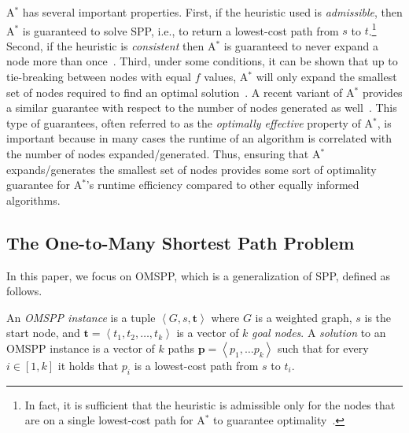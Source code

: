 \documentclass[smallextended]{svjour3}       %
\newcommand{\omspp}{\ac{OMSPP}\xspace}
\newcommand{\spp}{\ac{SPP}\xspace}
\newcommand{\astar}{A$^*$\xspace}
\newcommand{\tuple}[1]{\ensuremath{\left \langle #1 \right \rangle }}
\newcommand{\vect}[1]{\mathbf{#1}}
\newcommand{\roni}[1]{\textbf{[RS:#1]}}
\begin{document}
\astar has several important properties. 
First, if the heuristic used is \emph{admissible}, then \astar is guaranteed to solve SPP, i.e., to return a lowest-cost path from $s$ to $t$.\footnote{In fact, it is sufficient that the heuristic is admissible only for the nodes that are on a single lowest-cost path for \astar to guarantee optimality~\cite{karpas2012optimal,dechter1985generalizedBestFirst}.}
Second, if the heuristic is \emph{consistent} then \astar is guaranteed to never expand a node more than once~\cite{hartNR68Astar}.
Third, under some conditions, it can be shown that up to tie-breaking between nodes with equal $f$ values, \astar will only expand the smallest set of nodes required to find an optimal solution~\cite{dechter1985generalizedBestFirst}. 
A recent variant of \astar provides a similar guarantee with respect to the number of nodes generated as well~\cite{goldenberg2013optimal}. 
This type of guarantees, often referred to as the \emph{optimally effective} property of \astar, is important because in many cases the runtime of an algorithm is correlated with the number of nodes expanded/generated. 
Thus, ensuring that \astar expands/generates the smallest set of nodes provides some sort of optimality guarantee for \astar's runtime efficiency compared to other equally informed algorithms.



\subsection{The One-to-Many Shortest Path Problem}

In this paper, we focus on \omspp, which is a generalization of \spp, defined as follows. 
\begin{definition}
  \label{def:k-goal}
  An \emph{\omspp instance} is a tuple $\tuple{G, s, \vect{t}}$ where $G$ is a weighted graph, $s$ is the start node, and $\vect{t}=\tuple{t_1, t_2,\ldots, t_k}$ is a vector of $k$ \emph{goal nodes}. %
  A \emph{solution} to an \omspp instance is a vector of $k$ paths $\vect{p}=\tuple{p_1, \ldots p_k}$ such that for every  $i\in [1, k]$ it holds that $p_i$ is a lowest-cost path from $s$ to $t_i$.
\end{definition}
\end{document}
